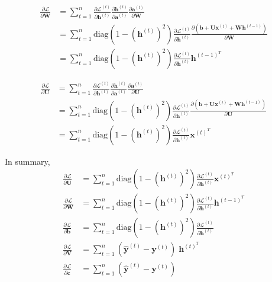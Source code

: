 \documentclass{article}
\begin{document}
\begin{equation}
\label{eqn:backward-W}
\begin{split}
	\frac{\partial \mathcal{L}}{\partial \bm{W}}
		&= \sum_{t=1}^{n} \frac{\partial \mathcal{L}^{(t)}}{\partial \bm{h}^{(t)}} \frac{\partial \bm{h}^{(t)}}{\partial \bm{a}^{(t)}} \frac{\partial \bm{a}^{(t)}}{\partial \bm{W}} \\
		&= \sum_{t=1}^{n} \text{diag}(1 - (\bm{h}^{(t)})^2) \frac{\partial \mathcal{L}^{(t)}}{\partial \bm{h}^{(t)}} \frac{\partial (\bm{b} + \bm{U}\bm{x}^{(t)} + \bm{W}\bm{h}^{(t-1)})}{\partial \bm{W}} \\
		&= \sum_{t=1}^{n} \text{diag}(1 - (\bm{h}^{(t)})^2) \frac{\partial \mathcal{L}^{(t)}}{\partial \bm{h}^{(t)}} \bm{h}^{(t-1)^T}
\end{split}
\end{equation}

\begin{equation}
\label{eqn:backward-U}
\begin{split}
	\frac{\partial \mathcal{L}}{\partial \bm{U}}
		&= \sum_{t=1}^{n} \frac{\partial \mathcal{L}^{(t)}}{\partial \bm{h}^{(t)}} \frac{\partial \bm{h}^{(t)}}{\partial \bm{a}^{(t)}} \frac{\partial \bm{a}^{(t)}}{\partial \bm{U}} \\
		&= \sum_{t=1}^{n} \text{diag}(1 - (\bm{h}^{(t)})^2) \frac{\partial \mathcal{L}^{(t)}}{\partial \bm{h}^{(t)}} \frac{\partial (\bm{b} + \bm{U}\bm{x}^{(t)} + \bm{W}\bm{h}^{(t-1)})}{\partial \bm{U}} \\
		&= \sum_{t=1}^{n} \text{diag}(1 - (\bm{h}^{(t)})^2) \frac{\partial \mathcal{L}^{(t)}}{\partial \bm{h}^{(t)}} \bm{x}^{(t)^T}
\end{split}
\end{equation}

In summary,
\begin{equation}
\label{eqn:backward-all}
\begin{split}
	\frac{\partial \mathcal{L}}{\partial \bm{U}}
		&= \sum_{t=1}^{n} \text{diag}(1 - (\bm{h}^{(t)})^2) \frac{\partial \mathcal{L}^{(t)}}{\partial \bm{h}^{(t)}} \bm{x}^{(t)^T} \\
	\frac{\partial \mathcal{L}}{\partial \bm{W}}
		&= \sum_{t=1}^{n} \text{diag}(1 - (\bm{h}^{(t)})^2) \frac{\partial \mathcal{L}^{(t)}}{\partial \bm{h}^{(t)}} \bm{h}^{(t-1)^T} \\
	\frac{\partial \mathcal{L}}{\partial \bm{b}}
		&= \sum_{t=1}^{n} \text{diag}(1 - (\bm{h}^{(t)})^2) \frac{\partial \mathcal{L}^{(t)}}{\partial \bm{h}^{(t)}} \\
	\frac{\partial \mathcal{L}}{\partial \bm{V}}
		&= \sum_{t=1}^{n} (\hat{\bm{y}}^{(t)} - \bm{y}^{(t)}) \; \bm{h}^{(t)^T} \\
	\frac{\partial \mathcal{L}}{\partial \bm{c}}
		&= \sum_{t=1}^{n} (\hat{\bm{y}}^{(t)} - \bm{y}^{(t)})
\end{split}
\end{equation}
\end{document}
